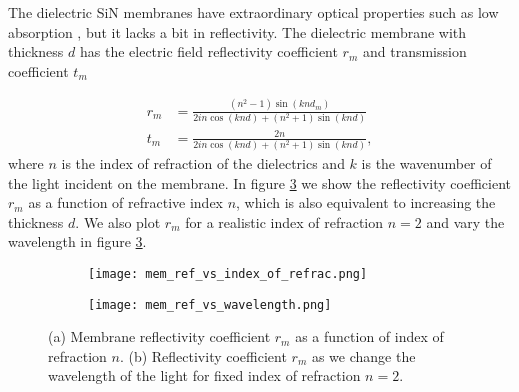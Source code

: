 The dielectric SiN membranes have extraordinary optical properties such as low absorption \cite{Wilson2011}, but it lacks a bit in reflectivity. The dielectric membrane with thickness $d$ has the electric field reflectivity coefficient $r_m$ and transmission coefficient $t_m$ \cite{jayich2008, Wilson2011}

\begin{align}
  \label{eq:mem_opt_prop}
  r_m & = \frac{(n^2 -1)\sin(knd_m)}{2in\cos(knd) + (n^2 +1)\sin(knd)} \\
  t_m & = \frac{2n}{2in\cos(knd) + (n^2 +1)\sin(knd)},
\end{align}
\noindent
where $n$ is the index of refraction of the dielectrics and $k$ is the wavenumber of the light incident on the membrane. In figure \ref{fig:mem_prop} we show the reflectivity coefficient $r_m$ as a function of refractive index $n$, which is also equivalent to increasing the thickness $d$. We also plot $r_m$ for a realistic index of refraction $n = 2$ \cite{Wilson2011} and vary the wavelength in figure \ref{fig:mem_prop}.

\begin{figure}[H]
\centering
    \begin{subfigure}[b]{0.49\textwidth}
    \centering
    \texttt{[image: mem\_ref\_vs\_index\_of\_refrac.png]}
    \caption{}
    \label{fig:mem_ref_refrac}
    \end{subfigure}
    \hfil
    \begin{subfigure}[b]{0.49\textwidth}
    \centering
    \texttt{[image: mem\_ref\_vs\_wavelength.png]}
    \caption{}
    \label{fig:mem_ref_wavelength}
    \end{subfigure}
\caption{(a) Membrane reflectivity coefficient $r_m$ as a function of index of refraction $n$. (b) Reflectivity coefficient $r_m$ as we change the wavelength of the light for fixed index of refraction $n = 2$.}
\label{fig:mem_prop}
\end{figure}